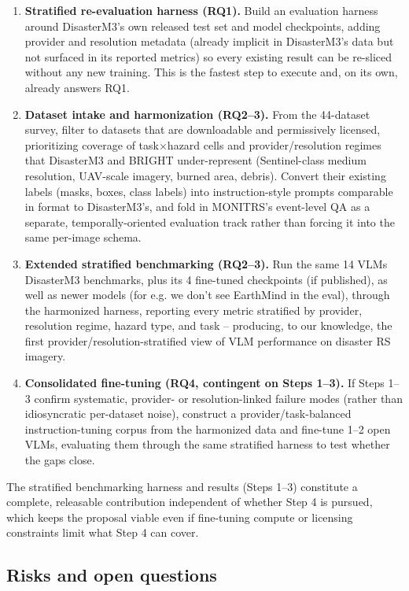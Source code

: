 \begin{enumerate}
  \item \textbf{Stratified re-evaluation harness (RQ1).} Build an evaluation
  harness around DisasterM3's own released test set and model checkpoints,
  adding provider and resolution metadata (already implicit in DisasterM3's
  data but not surfaced in its reported metrics) so every existing result can
  be re-sliced without any new training. This is the fastest step to execute
  and, on its own, already answers RQ1.
  \item \textbf{Dataset intake and harmonization (RQ2--3).} From the 44-dataset
  survey, filter to datasets that are downloadable and permissively licensed,
  prioritizing coverage of task$\times$hazard cells and provider/resolution
  regimes that DisasterM3 and BRIGHT under-represent (Sentinel-class medium
  resolution, UAV-scale imagery, burned area, debris). Convert their existing
  labels (masks, boxes, class labels) into instruction-style prompts
  comparable in format to DisasterM3's, and fold in MONITRS's event-level QA
  as a separate, temporally-oriented evaluation track rather than forcing it
  into the same per-image schema.
  \item \textbf{Extended stratified benchmarking (RQ2--3).} Run the same 14
  VLMs DisasterM3 benchmarks, plus its 4 fine-tuned checkpoints (if published), as well as newer models (for e.g. we don't see EarthMind in the eval), through the
  harmonized harness, reporting every metric stratified by provider,
  resolution regime, hazard type, and task -- producing, to our knowledge,
  the first provider/resolution-stratified view of VLM performance on
  disaster RS imagery.
  \item \textbf{Consolidated fine-tuning (RQ4, contingent on Steps 1--3).}
  If Steps 1--3 confirm systematic, provider- or resolution-linked failure
  modes (rather than idiosyncratic per-dataset noise), construct a
  provider/task-balanced instruction-tuning corpus from the harmonized data
  and fine-tune 1--2 open VLMs, evaluating them through the same stratified
  harness to test whether the gaps close.
\end{enumerate}

The stratified benchmarking harness and results (Steps 1--3) constitute a
complete, releasable contribution independent of whether Step 4 is pursued,
which keeps the proposal viable even if fine-tuning compute or licensing
constraints limit what Step 4 can cover.

\subsection{Risks and open questions}


